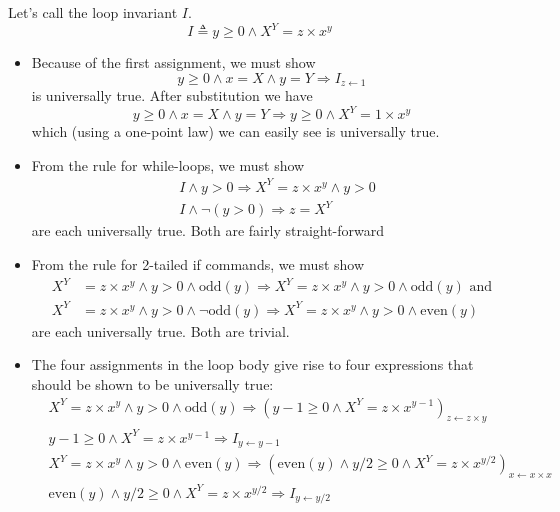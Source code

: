 \documentclass[muchmore,11pt]{article}%
\begin{document}
Let's call the loop invariant $I$.%
\[
I\triangleq y\geq0\wedge X^{Y}=z\times x^{y}%
\]


\begin{itemize}
\item Because of the first assignment, we must show%
\[
y\geq0\wedge x=X\wedge y=Y\Rightarrow I_{z\leftarrow1}%
\]
is universally true. After substitution we have%
\[
y\geq0\wedge x=X\wedge y=Y\Rightarrow y\geq0\wedge X^{Y}=1\times x^{y}%
\]
which (using a one-point law) we can easily see is universally true.

\item From the rule for while-loops, we must show%
\begin{align*}
&  I\wedge y>0\Rightarrow X^{Y}=z\times x^{y}\wedge y>0\\
&  I\wedge\lnot\left(  y>0\right)  \Rightarrow z=X^{Y}%
\end{align*}
are each universally true. Both are fairly straight-forward

\item From the rule for 2-tailed if commands, we must show%
\begin{align*}
X^{Y}  &  =z\times x^{y}\wedge y>0\wedge\mathrm{odd}(y)\Rightarrow
X^{Y}=z\times x^{y}\wedge y>0\wedge\mathrm{odd}(y)\text{ and}\\
X^{Y}  &  =z\times x^{y}\wedge y>0\wedge\lnot\mathrm{odd}(y)\Rightarrow
X^{Y}=z\times x^{y}\wedge y>0\wedge\mathrm{even}(y)
\end{align*}
are each universally true. Both are trivial.

\item The four assignments in the loop body give rise to four expressions that
should be shown to be universally true:%
\begin{align*}
&  \left.  X^{Y}=z\times x^{y}\wedge y>0\wedge\mathrm{odd}(y)\right.
\Rightarrow\left(  y-1\geq0\wedge X^{Y}=z\times x^{y-1}\right)  _{z\leftarrow
z\times y}\\
&  \left.  y-1\geq0\wedge X^{Y}=z\times x^{y-1}\right.  \Rightarrow
I_{y\leftarrow y-1}\\
&  \left.  X^{Y}=z\times x^{y}\wedge y>0\wedge\mathrm{even}(y)\right.
\Rightarrow\left(  \mathrm{even}(y)\wedge y/2\geq0\wedge X^{Y}=z\times
x^{y/2}\right)  _{x\leftarrow x\times x}\\
&  \left.  \mathrm{even}(y)\wedge y/2\geq0\wedge X^{Y}=z\times x^{y/2}\right.
\Rightarrow I_{y\leftarrow y/2}%
\end{align*}

\end{itemize}
\end{document}
